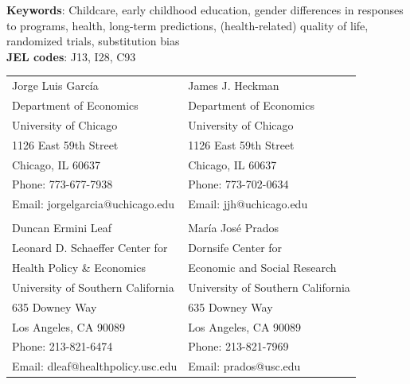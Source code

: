\noindent \textbf{Keywords}: Childcare, early childhood education, gender differences in responses to programs, health, long-term predictions, (health-related) quality of life, randomized trials, substitution bias \\
\noindent \textbf{JEL codes}: J13, I28, C93

\bigskip

\begin{tabular}{ll}
Jorge Luis Garc\'{i}a                                       & James J. Heckman \\
Department of Economics                                & Department of Economics \\
University of Chicago                                       & University of Chicago \\
1126 East 59th Street                                     & 1126 East 59th Street \\
Chicago, IL 60637                                           & Chicago, IL 60637 \\
Phone: 773-677-7938                                     & Phone: 773-702-0634  \\
Email: jorgelgarcia@uchicago.edu                       & Email: jjh@uchicago.edu \\
                                                                       & \\
Duncan Ermini Leaf                                           & Mar\'{i}a Jos\'{e} Prados \\
Leonard D. Schaeffer Center for            & Dornsife Center for  \\
Health Policy \& Economics                                          & Economic and Social Research \\
University of Southern California                        & University of Southern California \\
635 Downey Way                                             & 635 Downey Way        \\
Los Angeles, CA 90089                                    & Los Angeles, CA 90089 \\
Phone: 213-821-6474                                     & Phone: 213-821-7969 \\
Email: dleaf@healthpolicy.usc.edu                     & Email: prados@usc.edu \\

\end{tabular}


\clearpage

